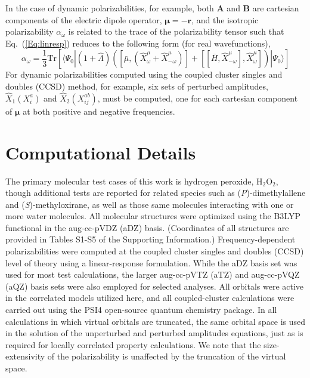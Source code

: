 In the case of dynamic polarizabilities, for example, both $\bm{A}$ and
$\bm{B}$ are cartesian components of the electric dipole operator, $\bm{\mu}
= -\bm{r}$, and the isotropic polarizability $\alpha_{\omega}$ is
related to the trace of the polarizability tensor such that Eq.\
(\ref{Eq:linresp}) reduces to the following form (for real
wavefunctions),
\begin{equation}
\alpha_{\omega} = \frac{1}{3} \mathrm{Tr}\left[
\langle\Psi_0|(1+\hat{\Lambda})\left(
\left[\bar{\mu},(\hat{X}^{{\mu}}_{\omega} +
\hat{X}^{{\mu}}_{-\omega})\right] +
\left[\left[\bar{H},\hat{X}^{{\mu}}_{-\omega}\right],
\hat{X}^{{\mu}}_{\omega}\right]\right) | \Psi_0\rangle\right]
\label{Eq:alpha}
\end{equation}
For dynamic polarizabilities computed using the coupled cluster singles and
doubles (CCSD) method, for example, six sets of perturbed amplitudes,
$\hat{X}_1 (X^{a}_{i})$ and $\hat{X}_2 (X^{ab}_{ij})$, must be computed, one for each cartesian
component of $\bm{\mu}$ at both positive and negative frequencies.

\section{Computational Details}

The primary molecular test cases of this work is hydrogen peroxide,
H$_2$O$_2$, though additional tests are reported for related species such as
(\textit{P})-dimethylallene and (\textit{S})-methyloxirane, as well as those
same molecules interacting with one or more water molecules.  All molecular
structures were optimized using the B3LYP
functional\cite{Becke93,Stephens94:B3LYP,Lee88:LYP} in the aug-cc-pVDZ (aDZ)
basis.\cite{Dunning89,Kendall92,Woon94} (Coordinates of all structures are
provided in Tables S1-S5 of the Supporting Information.) Frequency-dependent
polarizabilities were computed at the coupled cluster singles and doubles
(CCSD) level of theory\cite{Purvis82} using a linear-response
formulation.\cite{Christiansen98} While the aDZ basis set was used for most
test calculations, the larger aug-cc-pVTZ (aTZ) and aug-cc-pVQZ (aQZ) basis
sets were also employed for selected analyses.\cite{Kendall92} All orbitals
were active in the correlated models utilized here, and all coupled-cluster
calculations were carried out using the PSI4 open-source quantum chemistry
package.\cite{psi4}  In all calculations in which virtual orbitals are
truncated, the same orbital space is used in the solution of the unperturbed
and perturbed amplitudes equations, just as is required for locally correlated
property calculations.\cite{Crawford10}  We note that the size-extensivity of
the polarizability is unaffected by the truncation of
the virtual space.

